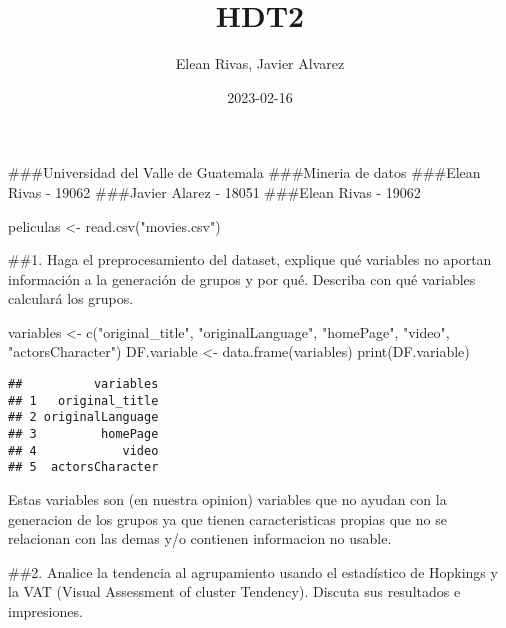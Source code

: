 \documentclass[
]{article}
\title{HDT2}
\author{Elean Rivas, Javier Alvarez}
\date{2023-02-16}
\newenvironment{Shaded}{\begin{snugshade}}{\end{snugshade}}
\newcommand{\FunctionTok}[1]{\textcolor[rgb]{0.00,0.00,0.00}{#1}}
\newcommand{\NormalTok}[1]{#1}
\newcommand{\OtherTok}[1]{\textcolor[rgb]{0.56,0.35,0.01}{#1}}
\newcommand{\StringTok}[1]{\textcolor[rgb]{0.31,0.60,0.02}{#1}}
\begin{document}
\maketitle

\#\#\#Universidad del Valle de Guatemala \#\#\#Mineria de datos
\#\#\#Elean Rivas - 19062 \#\#\#Javier Alarez - 18051 \#\#\#Elean Rivas
- 19062

\begin{Shaded}
\begin{Highlighting}[]
\NormalTok{peliculas }\OtherTok{\textless{}{-}} \FunctionTok{read.csv}\NormalTok{(}\StringTok{"movies.csv"}\NormalTok{)}
\end{Highlighting}
\end{Shaded}

\#\#1. Haga el preprocesamiento del dataset, explique qué variables no
aportan información a la generación de grupos y por qué. Describa con
qué variables calculará los grupos.

\begin{Shaded}
\begin{Highlighting}[]
\NormalTok{variables }\OtherTok{\textless{}{-}} \FunctionTok{c}\NormalTok{(}\StringTok{"original\_title"}\NormalTok{, }\StringTok{"originalLanguage"}\NormalTok{, }\StringTok{"homePage"}\NormalTok{, }\StringTok{"video"}\NormalTok{, }\StringTok{"actorsCharacter"}\NormalTok{)}
\NormalTok{DF.variable }\OtherTok{\textless{}{-}} \FunctionTok{data.frame}\NormalTok{(variables)}
\FunctionTok{print}\NormalTok{(DF.variable)}
\end{Highlighting}
\end{Shaded}

\begin{verbatim}
##          variables
## 1   original_title
## 2 originalLanguage
## 3         homePage
## 4            video
## 5  actorsCharacter
\end{verbatim}

Estas variables son (en nuestra opinion) variables que no ayudan con la
generacion de los grupos ya que tienen caracteristicas propias que no se
relacionan con las demas y/o contienen informacion no usable.

\#\#2. Analice la tendencia al agrupamiento usando el estadístico de
Hopkings y la VAT (Visual Assessment of cluster Tendency). Discuta sus
resultados e impresiones.
\end{document}
